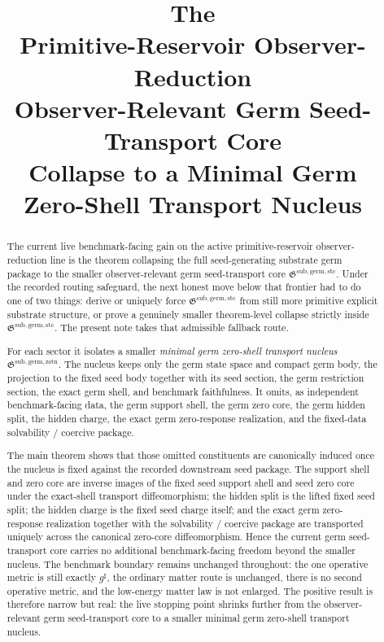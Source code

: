 \documentclass[11pt]{article}
\title{\textbf{The \TheoryName{}}\\[0.4em]
\large Primitive-Reservoir Observer-Reduction\\
\large Observer-Relevant Germ Seed-Transport Core\\
\large Collapse to a Minimal Germ\\
\large Zero-Shell Transport Nucleus}
\author{}
\date{}
\newcommand{\CompletedMetric}{g^{\sharp}}
\newcommand{\GermTransportCore}{\mathfrak G^{\mathrm{sub,germ,stc}}}
\newcommand{\GermNucleus}{\mathfrak G^{\mathrm{sub,germ,zstn}}}
\begin{document}
\maketitle

\begin{abstract}
The current live benchmark-facing gain on the active primitive-reservoir observer-reduction line is the theorem collapsing the full seed-generating substrate germ package to the smaller observer-relevant germ seed-transport core \(\GermTransportCore\). Under the recorded routing safeguard, the next honest move below that frontier had to do one of two things: derive or uniquely force \(\GermTransportCore\) from still more primitive explicit substrate structure, or prove a genuinely smaller theorem-level collapse strictly inside \(\GermTransportCore\). The present note takes that admissible fallback route.

For each sector it isolates a smaller \emph{minimal germ zero-shell transport nucleus} \(\GermNucleus\). The nucleus keeps only the germ state space and compact germ body, the projection to the fixed seed body together with its seed section, the germ restriction section, the exact germ shell, and benchmark faithfulness. It omits, as independent benchmark-facing data, the germ support shell, the germ zero core, the germ hidden split, the hidden charge, the exact germ zero-response realization, and the fixed-data solvability / coercive package.

The main theorem shows that those omitted constituents are canonically induced once the nucleus is fixed against the recorded downstream seed package. The support shell and zero core are inverse images of the fixed seed support shell and seed zero core under the exact-shell transport diffeomorphism; the hidden split is the lifted fixed seed split; the hidden charge is the fixed seed charge itself; and the exact germ zero-response realization together with the solvability / coercive package are transported uniquely across the canonical zero-core diffeomorphism. Hence the current germ seed-transport core carries no additional benchmark-facing freedom beyond the smaller nucleus. The benchmark boundary remains unchanged throughout: the one operative metric is still exactly \(\CompletedMetric\), the ordinary matter route is unchanged, there is no second operative metric, and the low-energy matter law is not enlarged. The positive result is therefore narrow but real: the live stopping point shrinks further from the observer-relevant germ seed-transport core to a smaller minimal germ zero-shell transport nucleus.
\end{abstract}
\end{document}
